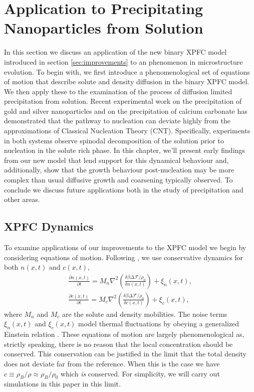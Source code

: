 \documentclass[showkeys, prb, reprint]{revtex4-1}
\renewcommand{\d}{\delta}       %
\newcommand{\F}{\mathcal{F}}    %
\renewcommand{\l}{\left}        %
\renewcommand{\r}{\right}       %
\newcommand{\f}{\frac}          %
\newcommand{\B}{\rho_B}         %
\begin{document}
\section{Application to Precipitating Nanoparticles from Solution} %

In this section we discuss an application of the new binary XPFC model
introduced in section \ref{sec:improvements} to an phenomenon in
microstructure evolution.  To begin with, we first introduce  a
phenomenological set of equations of motion that describe solute and density
diffusion in the binary XPFC model. We then apply these to the examination of
the process of diffusion limited precipitation from solution.  Recent
experimental work on the precipitation of gold and silver nanoparticles
\cite{LOH17} and on the precipitation of calcium carbonate \cite{WALLACE13} has
demonstrated that the pathway to nucleation can deviate highly from the
approximations of Classical Nucleation Theory (CNT).  Specifically, 
experiments in both systems observe spinodal decomposition of the solution prior to nucleation in the solute rich phase. In this chapter, we'll present early findings from
our new model that lend support for this dynamical behaviour and, additionally,
show that the growth behaviour post-nucleation may be more complex than usual
diffusive growth and coarsening typically observed.  To conclude we discuss
future applications both in the study of precipitation and other areas.

\subsection{XPFC Dynamics} %

To examine applications of our improvements to the XPFC model we begin by
considering equations of motion. Following \cite{GREENWOOD11_BINARY}, we use
conservative dynamics for both $n(x, t)$ and $c(x, t)$,
%
\begin{gather}
    \f{\partial n(x, t)}{\partial t} = 
        M_n \nabla^2\l(\f{\d \beta \Delta\F / \rho_0}{\d n(x, t)}\r) 
        + \xi_n(x, t), \\ 
    \f{\partial c(x, t)}{\partial t} = 
        M_c \nabla^2\l(\f{\d \beta \Delta \F / \rho_0}{\d c(x, t)}\r)
        + \xi_c(x, t),
\end{gather}
%
where $M_n$ and $M_c$ are the solute and density mobilities. The noise terms
$\xi_n(x, t)$ and $\xi_c(x, t)$ model thermal fluctuations by obeying a
generalized Einstein relation \cite{SMITHMSC}. These equations of motion are largely
phenomenological as, strictly speaking, there is no reason that the local
concentration should be conserved.  This conservation can be justified in the
limit that the total density does not deviate far from the reference. When this
is the case we have $c \equiv \B / \rho \approx \B / \rho_0$ which \textit{is}
conserved. For simplicity, we will carry out simulations in this paper in this
limit.
\end{document}
